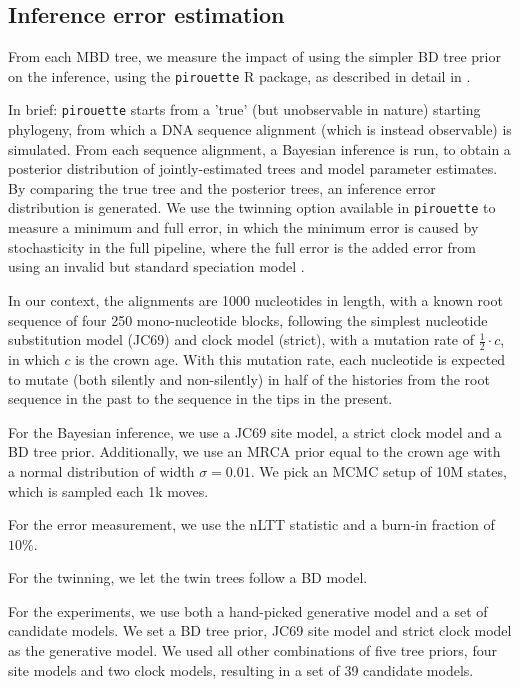 \subsection{Inference error estimation}

From each MBD tree, we measure the impact of using the simpler BD tree prior on the inference, using the \verb;pirouette; R package, as described in detail in \citet{bilderbeek2019pirouette}.

In brief: \verb;pirouette; starts from a 'true' (but unobservable in nature) starting phylogeny, from which a DNA sequence alignment (which is instead observable) is simulated. 
From each sequence alignment, a Bayesian inference is run, to obtain a posterior distribution of jointly-estimated trees and model parameter estimates.
By comparing the true tree and the posterior trees, an inference error distribution is generated. 
We use the twinning option available in \verb;pirouette; to measure a minimum and full error, in which the minimum error is caused by stochasticity in the full pipeline, where the full error is the added error from using an invalid but standard speciation model .

In our context, the alignments are 1000 nucleotides in length, with a known root sequence of four 250 mono-nucleotide blocks, following the simplest nucleotide substitution model (JC69) and clock model (strict), with a mutation rate of $\frac{1}{2}\cdot c$,  in which $c$ is the crown age. With this mutation rate, each nucleotide is expected to mutate (both silently and non-silently) 
in half of the histories from the root sequence in the past to the sequence in the tips in the present.

For the Bayesian inference, we use a JC69 site model, a strict
clock model and a BD tree prior. Additionally, we use 
an MRCA prior equal to the crown age with a normal distribution 
of width $\sigma = 0.01$. We pick an MCMC setup of 10M states,
which is sampled each 1k moves.

For the error measurement, we use the nLTT statistic \citet{janzen2015} and
a burn-in fraction of $10\%$.

For the twinning, we let the twin trees follow a BD model.

For the experiments, we use both a hand-picked generative model
and a set of candidate models. We set a BD tree prior, JC69 site
model and strict clock model as the generative model. We used
all other combinations of five tree priors, four site models and two clock models, resulting in a set of 39 candidate models.
